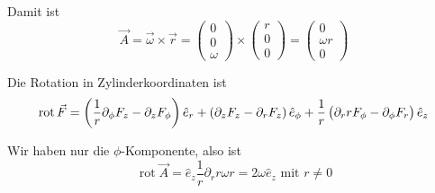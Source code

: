 \documentclass[a4paper,german,12pt,smallheadings]{scrartcl}
\begin{document}
\begin{enumerate}[a)]
    Damit ist
    \begin{equation}
      \vec{A}
      = \vec{\omega} \times \vec{r}
      = \begin{pmatrix} 0 \\ 0 \\ \omega \end{pmatrix} \times  \begin{pmatrix} r \\ 0 \\ 0\end{pmatrix}
      = \begin{pmatrix} 0 \\ \omega r\\ 0 \end{pmatrix}
    \end{equation}

    Die Rotation in Zylinderkoordinaten ist
    \begin{equation}
      \operatorname{rot} \vec{F} =
      \del{\frac{1}{r} \partial_\phi F_z - \partial_z F_\phi} \hat{e}_r +
      \del{\partial_z F_z - \partial_r F_z} \hat{e}_\phi +
      \frac{1}{r} \del{\partial_r r F_\phi - \partial_\phi F_r} \hat{e}_z
    \end{equation}

    Wir haben nur die $\phi$-Komponente, also ist
    \begin{equation}
      \operatorname{rot} \vec{A} = \hat{e}_z \frac{1}{r} \partial_r r \omega r = 2 \omega \hat{e}_z \text{ mit } r \neq 0
    \end{equation}
\end{enumerate}
\end{document}
